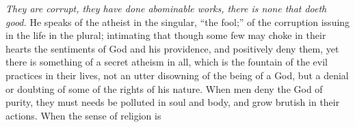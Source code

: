 \emph{They are corrupt, they have done abominable works, there is none that
doeth good.} He speaks of the atheist in the singular, ``the fool;'' of
the corruption issuing in the life in the plural; intimating that though
some few may choke in their hearts the sentiments of God and his
providence, and positively deny them, yet there is something of a
secret atheism in all, which is the fountain of the evil practices in
their lives, not an utter disowning of the being of a God, but a denial
or doubting of some of the rights of his nature. When men deny
the God of purity, they must needs be polluted in soul and body,
and grow brutish in their actions. When the sense of religion is

